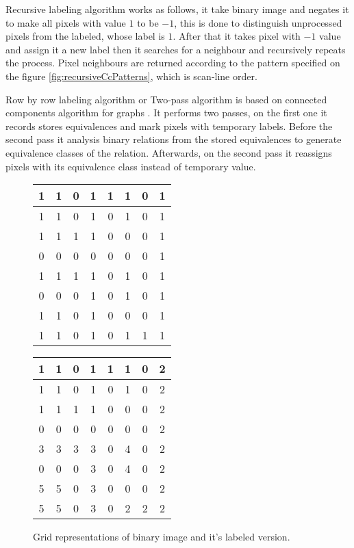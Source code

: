 \documentclass[../../../../main]{subfiles}
\begin{document}
Recursive labeling algorithm works as follows, it take binary image and negates it to make all pixels with value $1$ to be $-1$, this is done to distinguish unprocessed pixels from the labeled, whose label is $1$. After that it takes pixel with $-1$ value and assign it a new label then it searches for a neighbour and recursively repeats the process. Pixel neighbours are returned according to the pattern specified on the figure \ref{fig:recursiveCcPatterns}, which is scan-line order.

Row by row labeling algorithm or Two-pass algorithm is based on connected components algorithm for graphs \cite{rosenfeldpfaltz}. It performs two passes, on the first one it records stores equivalences and mark pixels with temporary labels. Before the second pass it analysis binary relations from the stored equivalences to generate equivalence classes of the relation. Afterwards, on the second pass it reassigns pixels with its equivalence class instead of temporary value.

\begin{figure} [!ht]
  \centering    
     \begin{tabular}{ |c|c|c|c|c|c|c|c| }
        \hline
        1  & 1  & 0  & 1  & 1  & 1  & 0  & 1\\
        \hline
        1  & 1  & 0  & 1  & 0  & 1  & 0  & 1\\
        \hline
        1  & 1  & 1  & 1  & 0  & 0  & 0  & 1\\
        \hline
        0  & 0  & 0  & 0  & 0  & 0  & 0  & 1\\
        \hline
        1  & 1  & 1  & 1  & 0  & 1  & 0  & 1\\
        \hline
        0  & 0  & 0  & 1  & 0  & 1  & 0  & 1\\
        \hline
        1  & 1  & 0  & 1  & 0  & 0  & 0  & 1\\
        \hline
        1  & 1  & 0  & 1  & 0  & 1  & 1  & 1\\
        \hline
    \end{tabular}
    \begin{tabular}{ |c|c|c|c|c|c|c|c| }
        \hline
        1& 1& 0& 1& 1& 1& 0& 2\\
        \hline
        1& 1& 0& 1& 0& 1& 0& 2\\
        \hline
        1& 1& 1& 1& 0& 0& 0& 2\\
        \hline
        0& 0& 0& 0& 0& 0& 0& 2\\
        \hline
        3& 3& 3& 3& 0& 4& 0& 2\\
        \hline
        0& 0& 0& 3& 0& 4& 0& 2\\
        \hline
        5& 5& 0& 3& 0& 0& 0& 2\\
        \hline
        5& 5& 0& 3& 0& 2& 2& 2\\
        \hline
    \end{tabular}
  \caption{Grid representations of binary image and it's labeled version.}
\end{figure}
\end{document}

